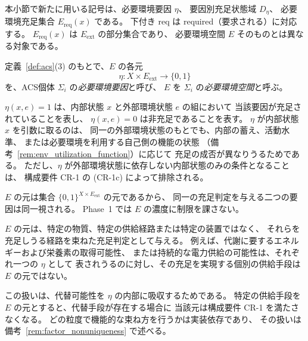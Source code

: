 本小節で新たに用いる記号は、必要環境要因 $\eta$、
要因別充足状態域 $D_\eta$、
必要環境充足集合 $E_{\mathrm{req}}(x)$ である。
下付き $\mathrm{req}$ は required（要求される）に対応する。
$E_{\mathrm{req}}(x)$ は $E_{\mathrm{ext}}$ の部分集合であり、
必要環境空間 $E$ そのものとは異なる対象である。

\begin{definition}[必要環境要因と必要環境空間]
\label{def:environment_space}
定義~\ref{def:acs}(3) のもとで、$E$ の各元
\[
  \eta:X\times E_{\mathrm{ext}}\to\{0,1\}
\]
を、ACS個体 $\Sigma_i$ の\emph{必要環境要因}と呼び、
$E$ を $\Sigma_i$ の\emph{必要環境空間}と呼ぶ。

$\eta(x,e)=1$ は、内部状態 $x$ と外部環境状態 $e$ の組において
当該要因が充足されていることを表し、
$\eta(x,e)=0$ は非充足であることを表す。
$\eta$ が内部状態 $x$ を引数に取るのは、
同一の外部環境状態のもとでも、内部の蓄え、活動水準、
または必要環境を利用する自己側の機能の状態
（備考~\ref{rem:env_utilization_function}）に応じて
充足の成否が異なりうるためである。
ただし、$\eta$ が外部環境状態に依存しない内部状態のみの条件となることは、
構成要件 CR-1 の (CR-1c) によって排除される。

$E$ の元は集合 $\{0,1\}^{X\times E_{\mathrm{ext}}}$ の元であるから、
同一の充足判定を与える二つの要因は同一視される。
Phase~1 では $E$ の濃度に制限を課さない。
\end{definition}

\begin{remark}[必要環境要因は特定の供給手段ではない]
\label{rem:factor_functional_class}
$E$ の元は、特定の物質、特定の供給経路または特定の装置ではなく、
それらを充足しうる経路を束ねた充足判定として与える。
例えば、代謝に要するエネルギーおよび栄養素の取得可能性、
または持続的な電力供給の可能性は、それぞれ一つの $\eta$ として
表されうるのに対し、その充足を実現する個別の供給手段は
$E$ の元ではない。

この扱いは、代替可能性を $\eta$ の内部に吸収するためである。
特定の供給手段を $E$ の元とすると、代替手段が存在する場合に
当該元は構成要件 CR-1 を満たさなくなる。
どの粒度で機能的な束ね方を行うかは実装依存であり、
その扱いは備考~\ref{rem:factor_nonuniqueness} で述べる。
\end{remark}

